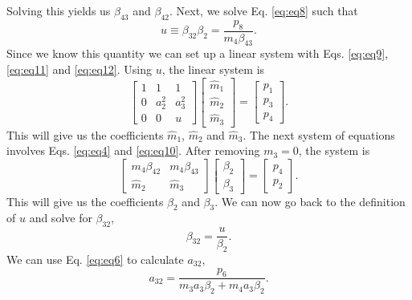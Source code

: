 \documentclass{ansconf}
\numberwithin{equation}{section}
\begin{document}
Solving this yields us $\beta_{43}$ and $\beta_{42}$. Next, we solve Eq. \eqref{eq:eq8} such that
\begin{equation}
	u \equiv \beta_{32}\beta_2 = \frac{p_8}{m_4\beta_{43}}.
\end{equation}
Since we know this quantity we can set up a linear system with Eqs. \eqref{eq:eq9}, \eqref{eq:eq11} and \eqref{eq:eq12}. Using $u$, the linear system is
\begin{equation}
	\left[ \begin{array}{ccc}
		1 & 1 & 1 \\
		0 & a_2^2 & a_3^2 \\
		0 & 0 & u
			\end{array} \right] 
	\left[ \begin{array}{c}
		\hat{m}_1 \\ \hat{m}_2 \\ \hat{m}_3
			\end{array}\right] =
	\left[ \begin{array}{c}
		p_1 \\ p_3 \\ p_4
			\end{array}\right].
\end{equation}
This will give us the coefficients $\hat{m}_1$, $\hat{m}_2$ and $\hat{m}_3$. The next system of equations involves Eqs. \eqref{eq:eq4} and \eqref{eq:eq10}. After removing $m_3=0$, the system is
\begin{equation}
	\left[ \begin{array}{cc}
		m_4\beta_{42} & m_4\beta_{43} \\
		\hat{m}_2 & \hat{m}_3
			\end{array} \right] 
	\left[ \begin{array}{c}
		\beta_{2} \\ \beta_{3}
			\end{array}\right] =
	\left[ \begin{array}{c}
		p_4 \\ p_2
			\end{array}\right].
\end{equation}
This will give us the coefficients $\beta_2$ and $\beta_3$. We can now go back to the definition of $u$ and solve for $\beta_{32}$,
\begin{equation}
	\beta_{32} = \frac{u}{\beta_2}.
\end{equation}
We can use Eq. \eqref{eq:eq6} to calculate $a_32$,
\begin{equation}
	a_{32} = \frac{p_6}{m_3a_3\beta_2 + m_4a_3\beta_2}.
\end{equation}
\end{document}
